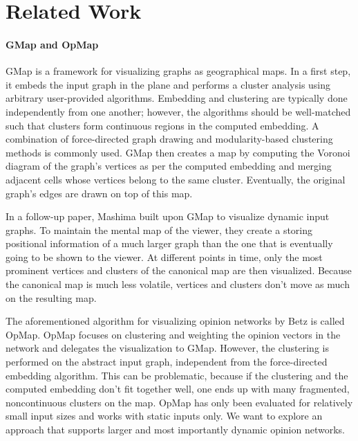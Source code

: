 \section{Related Work}
\label{sect:related-work}


\paragraph{GMap and OpMap}

GMap \cite{gansner2009gmap} is a framework for visualizing graphs as geographical maps.
In a first step, it embeds the input graph in the plane and performs a cluster analysis using arbitrary user-provided algorithms.
Embedding and clustering are typically done independently from one another; however, the algorithms should be well-matched such that clusters form continuous regions in the computed embedding.
A combination of force-directed graph drawing and modularity-based clustering methods is commonly used.
GMap then creates a map by computing the Voronoi diagram of the graph's vertices as per the computed embedding and merging adjacent cells whose vertices belong to the same cluster.
Eventually, the original graph's edges are drawn on top of this map.

In a follow-up paper, Mashima \etal{} \cite{mashima2011visualizing} built upon GMap to visualize dynamic input graphs.
To maintain the mental map of the viewer, they create a  storing positional information of a much larger graph than the one that is eventually going to be shown to the viewer.
At different points in time, only the most prominent vertices and clusters of the canonical map are then visualized.
Because the canonical map is much less volatile, vertices and clusters don't move as much on the resulting map.

The aforementioned algorithm for visualizing opinion networks by Betz \etal{} is called OpMap.
OpMap focuses on clustering and weighting the opinion vectors in the network and delegates the visualization to GMap.
However, the clustering is performed on the abstract input graph, independent from the force-directed embedding algorithm.
This can be problematic, because if the clustering and the computed embedding don't fit together well, one ends up with many fragmented, noncontinuous clusters on the map.
OpMap has only been evaluated for relatively small input sizes and works with static inputs only.
We want to explore an approach that supports larger \emdash{} and most importantly dynamic \emdash{} opinion networks.

